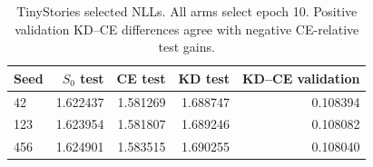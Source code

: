 \begin{table}[!t]
\centering
\begin{tabular}{lrrrr}
\toprule
Seed & $S_0$ test & CE test & KD test & KD--CE validation\\
\midrule
42 & 1.622437 & 1.581269 & 1.688747 & 0.108394\\
123 & 1.623954 & 1.581807 & 1.689246 & 0.108082\\
456 & 1.624901 & 1.583515 & 1.690255 & 0.108040\\
\bottomrule
\end{tabular}
\caption{TinyStories selected NLLs. All arms select epoch 10. Positive validation KD--CE differences agree with negative CE-relative test gains.}
\label{tab:ts_endpoints}
\end{table}
